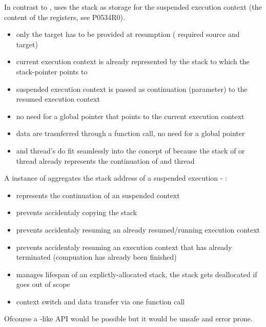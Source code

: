 

In contrast to \uc, \cc uses the stack as storage for the suspended
execution context (the content of the registers, see P0534R0\cite{P0534R0}).

\begin{itemize}
    \item only the target has to be provided at resumption
        ( required source and target)
    \item current execution context is already represented by the
        stack to which the stack-pointer points to
    \item suspended execution context is passed as continuation (parameter) 
        to the resumed execution context
    \item no need for a global pointer that points to the current execution context
    \item data are trasnferred through a function call, no need for a global pointer
    \item \main and thread's \entryfn do fit seamlessly into the concept of \cc
        because the stack of \main or thread already represents the continuation of \main
        and thread
\end{itemize}


A instance of \cont aggregates the stack address of a suspended execution
- \cont:

\begin{itemize}
    \item represents the continuation of an suspended context
    \item prevents accidentaly copying the stack
    \item prevents accidentaly resuming an already resumed/running execution
        context
    \item prevents accidentaly resuming an execution context that has already
        terminated (compuation has already been finished)
    \item manages lifespan of an explictly-allocated stack, the stack gets
        deallocated if \cont goes out of scope
    \item context switch and data transfer via one function call
\end{itemize}

Ofcourse a \uc-like API would be possible but it would be unsafe and error
prone.


